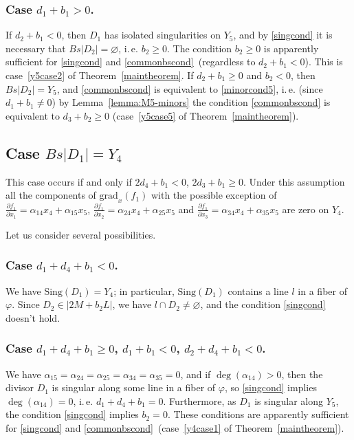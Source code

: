 \documentclass[12pt]{amsart}
\theoremstyle{definition}
\theoremstyle{remark}
\begin{document}
\subsubsection{Case $d_1+b_1>0$.} 
If $d_2+b_1<0$, then $D_1$ has isolated singularities on $Y_5$, and by 
\ref{singcond} it is necessary that $Bs|D_2|=\varnothing$,
i.\,e. $b_2\geqslant 0$. The condition $b_2\geqslant 0$ is apparently  
sufficient for \ref{singcond} and \ref{commonbscond}\
(regardless to $d_2+b_1<0$). 
This is case~\ref{y5case2} of Theorem~\ref{maintheorem}.
If $d_2+b_1\geqslant 0$ and $b_2<0$, then $Bs|D_2|=Y_5$, 
and \ref{commonbscond} is equivalent to \ref{minorcond5},
i.\,e. (since $d_1+b_1\neq 0$) by Lemma~\ref{lemma:M5-minors} 
the condition \ref{commonbscond} is equivalent to $d_3+b_2\geqslant 0$
(case~\ref{y5case5} of Theorem~\ref{maintheorem}). 


\subsection{Case $Bs|D_1|=Y_4$}

This case occurs if and only if $2d_4+b_1< 0$, $2d_3+b_1\geqslant 0$.
Under this assumption all the components of ${\mathrm{grad}_x}(f_1)$
with the possible exception of
$\frac{\partial f_1}{\partial x_1}=\alpha_{14}x_4+\alpha_{15}x_5$, 
$\frac{\partial f_1}{\partial x_2}=\alpha_{24}x_4+\alpha_{25}x_5$ and 
$\frac{\partial f_1}{\partial x_3}=\alpha_{34}x_4+\alpha_{35}x_5$
are zero on $Y_4$.

Let us consider several possibilities.

\subsubsection{Case $d_1+d_4+b_1<0$.} 
We have ${\mathrm{Sing}}(D_1)=Y_4$; in particular, ${\mathrm{Sing}}(D_1)$ 
contains a line $l$ in a fiber of $\varphi$. Since $D_2\in |2M+b_2L|$, 
we have $l\cap D_2\neq\varnothing$, and the condition \ref{singcond} 
doesn't hold.

\subsubsection{Case $d_1+d_4+b_1\geqslant 0$, $d_1+b_1<0$, $d_2+d_4+b_1<0$.} 
We have $\alpha_{15}=\alpha_{24}=\alpha_{25}=\alpha_{34}=\alpha_{35}=0$,
and if $\deg(\alpha_{14})>0$, then the divisor $D_1$ is singular along some 
line in a fiber of $\varphi$, so \ref{singcond} implies  
$\deg(\alpha_{14})=0$, i.\,e. $d_1+d_4+b_1=0$. Furthermore, as $D_1$ is singular
along $Y_5$, the condition \ref{singcond} implies $b_2=0$.
These conditions are apparently sufficient for \ref{singcond} and 
\ref{commonbscond}\
(case~\ref{y4case1} of Theorem~\ref{maintheorem}). 
\end{document}
